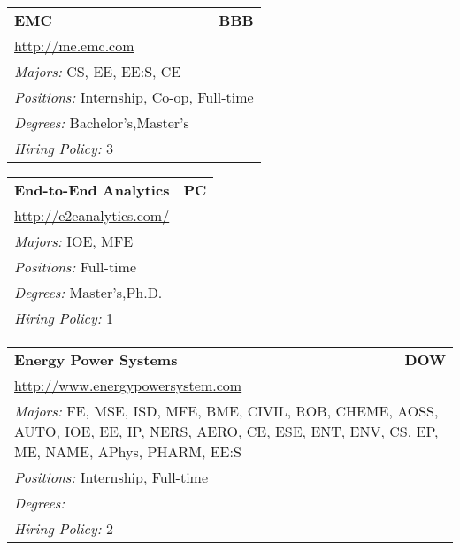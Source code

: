 \documentclass[twoside]{article}
\begin{document}
\begin{center}
\begin{multicols}{3}
\begin{FlushLeft}
\begin{minipage}{\columnwidth}
\end{minipage}
 
\begin{minipage}{\columnwidth}\begin{tabularx}{.95\columnwidth}{Xr}
                 {\Large\bf EMC} & {\Large\bf BBB}\\
    \multicolumn{2}{p{.95\columnwidth}}{\url{http://me.emc.com}}\\
    \multicolumn{2}{p{.95\columnwidth}}{\emph{Majors:} CS, EE, EE:S, CE}\\
    \multicolumn{2}{p{.95\columnwidth}}{\emph{Positions:} Internship, Co-op, Full-time}\\
    \multicolumn{2}{p{.95\columnwidth}}{\emph{Degrees:} Bachelor's,Master's}\\
    \multicolumn{2}{p{.95\columnwidth}}{\emph{Hiring Policy:} 3}\\
    \end{tabularx}
    
\end{minipage}
 
\begin{minipage}{\columnwidth}\begin{tabularx}{.95\columnwidth}{Xr}
                 {\Large\bf End-to-End Analytics} & {\Large\bf PC}\\
    \multicolumn{2}{p{.95\columnwidth}}{\url{http://e2eanalytics.com/}}\\
    \multicolumn{2}{p{.95\columnwidth}}{\emph{Majors:} IOE, MFE}\\
    \multicolumn{2}{p{.95\columnwidth}}{\emph{Positions:} Full-time}\\
    \multicolumn{2}{p{.95\columnwidth}}{\emph{Degrees:} Master's,Ph.D.}\\
    \multicolumn{2}{p{.95\columnwidth}}{\emph{Hiring Policy:} 1}\\
    \end{tabularx}
    
\end{minipage}
 
\begin{minipage}{\columnwidth}\begin{tabularx}{.95\columnwidth}{Xr}
                 {\Large\bf Energy Power Systems} & {\Large\bf DOW}\\
    \multicolumn{2}{p{.95\columnwidth}}{\url{http://www.energypowersystem.com}}\\
    \multicolumn{2}{p{.95\columnwidth}}{\emph{Majors:} FE, MSE, ISD, MFE, BME, CIVIL, ROB, CHEME, AOSS, AUTO, IOE, EE, IP, NERS, AERO, CE, ESE, ENT, ENV, CS, EP, ME, NAME, APhys, PHARM, EE:S}\\
    \multicolumn{2}{p{.95\columnwidth}}{\emph{Positions:} Internship, Full-time}\\
    \multicolumn{2}{p{.95\columnwidth}}{\emph{Degrees:} }\\
    \multicolumn{2}{p{.95\columnwidth}}{\emph{Hiring Policy:} 2}\\
    \end{tabularx}
    

\end{minipage}
\end{FlushLeft}
\end{multicols}
\end{center}
\end{document}
